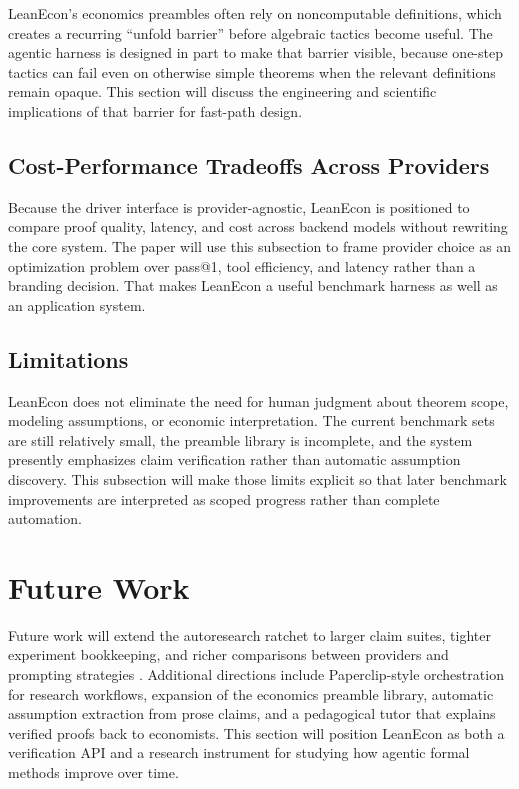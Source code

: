 \documentclass[11pt,letterpaper]{article}
\begin{document}
LeanEcon's economics preambles often rely on noncomputable definitions, which creates a recurring ``unfold barrier'' before algebraic tactics become useful. The agentic harness is designed in part to make that barrier visible, because one-step tactics can fail even on otherwise simple theorems when the relevant definitions remain opaque. This section will discuss the engineering and scientific implications of that barrier for fast-path design.

\subsection{Cost-Performance Tradeoffs Across Providers}

Because the driver interface is provider-agnostic, LeanEcon is positioned to compare proof quality, latency, and cost across backend models without rewriting the core system. The paper will use this subsection to frame provider choice as an optimization problem over pass@1, tool efficiency, and latency rather than a branding decision. That makes LeanEcon a useful benchmark harness as well as an application system.

\subsection{Limitations}

LeanEcon does not eliminate the need for human judgment about theorem scope, modeling assumptions, or economic interpretation. The current benchmark sets are still relatively small, the preamble library is incomplete, and the system presently emphasizes claim verification rather than automatic assumption discovery. This subsection will make those limits explicit so that later benchmark improvements are interpreted as scoped progress rather than complete automation.

\section{Future Work}

Future work will extend the autoresearch ratchet to larger claim suites, tighter experiment bookkeeping, and richer comparisons between providers and prompting strategies \citep{karpathy_autoresearch,leanstral}. Additional directions include Paperclip-style orchestration for research workflows, expansion of the economics preamble library, automatic assumption extraction from prose claims, and a pedagogical tutor that explains verified proofs back to economists. This section will position LeanEcon as both a verification API and a research instrument for studying how agentic formal methods improve over time.
\end{document}
